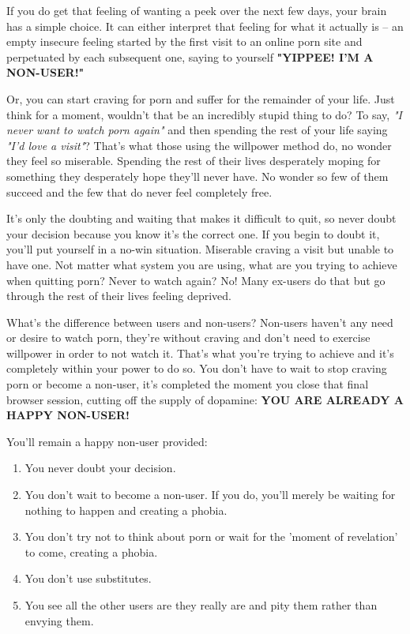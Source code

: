 \documentclass[easypeasy.tex]{subfiles}
\begin{document}
If you do get that feeling of wanting a peek over the next few days, your brain has a simple choice. It can either interpret that feeling for what it actually is -- an empty insecure feeling started by the first visit to an online porn site and perpetuated by each subsequent one, saying to yourself \textbf{"YIPPEE! I'M A NON-USER!"}

Or, you can start craving for porn and suffer for the remainder of your life. Just think for a moment, wouldn't that be an incredibly stupid thing to do? To say, \textit{"I never want to watch porn again"} and then spending the rest of your life saying \textit{"I'd love a visit"}? That's what those using the willpower method do, no wonder they feel so miserable. Spending the rest of their lives desperately moping for something they desperately hope they'll never have. No wonder so few of them succeed and the few that do never feel completely free.

It's only the doubting and waiting that makes it difficult to quit, so never doubt your decision because you know it's the correct one. If you begin to doubt it, you'll put yourself in a no-win situation. Miserable craving a visit but unable to have one. Not matter what system you are using, what are you trying to achieve when quitting porn? Never to watch again? No! Many ex-users do that but go through the rest of their lives feeling deprived.

What's the difference between users and non-users? Non-users haven't any need or desire to watch porn, they're without craving and don't need to exercise willpower in order to not watch it. That's what you're trying to achieve and it's completely within your power to do so. You don't have to wait to stop craving porn or become a non-user, it's completed the moment you close that final browser session, cutting off the supply of dopamine: \textbf{YOU ARE ALREADY A HAPPY NON-USER!}

  You'll remain a happy non-user provided:
\begin{enumerate}
  \item You never doubt your decision.
  \item You don't wait to become a non-user. If you do, you'll merely be waiting for nothing to happen and creating a phobia.
  \item You don't try not to think about porn or wait for the 'moment of revelation' to come, creating a phobia.
  \item You don't use substitutes.
  \item You see all the other users are they really are and pity them rather than envying them.
\end{enumerate}
  
\end{document}
